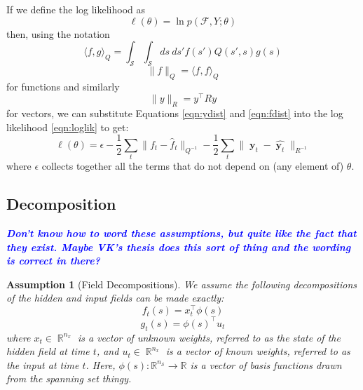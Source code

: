 \documentclass{IEEEtran}
\newcommand{\todo}[1]{\textsf{\emph{\textbf{\textcolor{blue}{#1}}}}}
\newcommand{\inner}[3]{\langle#1,#2\rangle_{#3}}
\newcommand{\dist}[2]{\|#1\|_{#2}}
\DeclareMathOperator{\R}{\mathbb{R}}
\DeclareMathOperator{\yvec}{\mathbf{y}}
\DeclareMathOperator{\onto}{\rightarrow}
\newtheorem{assumption}{Assumption}
\begin{document}
If we define the log likelihood as
\begin{equation}
	\label{eqn:loglik}
	\ell(\theta) = \ln p(\mathcal{F}, Y;\theta)
\end{equation}
then, using the notation
\begin{equation}
	\inner{f}{g}{Q} = \int_\mathcal{S} \int_\mathcal{S} ds~ds' f(s') Q(s',s) g(s)
\end{equation}
\begin{equation}
	\dist{f}{Q} = \inner{f}{f}{Q}
\end{equation}
for functions and similarly
\begin{equation}
	\dist{y}{R} = y^\top Ry
\end{equation}
for vectors, we can substitute Equations \ref{eqn:ydist} and \ref{eqn:fdist} into the log likelihood \ref{eqn:loglik} to get:
\begin{equation}
	\ell(\theta) =  \epsilon  - \frac{1}{2}\sum_t\dist{f_t - \hat{f}_t}{Q^{-1}} - \frac{1}{2}\sum_t\dist{\yvec_t-\hat{\yvec_t}}{R^{-1}}
\end{equation}
where $\epsilon$ collects together all the terms that do not depend on (any element of) $\theta$.

\subsection{Decomposition}

\todo{Don't know how to word these assumptions, but quite like the fact that they exist. Maybe VK's thesis does this sort of thing and the wording is correct in there?}

\begin{assumption}[Field Decompositions]
	\label{ass:fielddecomp}
	We assume the following decompositions of the hidden and input fields can be made exactly:
\begin{equation}
	\label{eq:f decomp}
	f_t(s) = x_t^\top\phi(s)
\end{equation}
\begin{equation}
	g_t(s) = \phi(s)^\top u_t
\end{equation}	 
where $x_t \in \R^{n_x}$ is a vector of unknown weights, referred to as the state of the hidden field at time $t$, and $u_t \in \R^{n_x}$ is a vector of known weights, referred to as the input at time $t$. Here, $\phi(s) : \mathbb{R}^{n_\mathcal{S}} \onto \mathbb{R}$ is a vector of basis functions drawn from the spanning set thingy.
\end{assumption}
\end{document}
